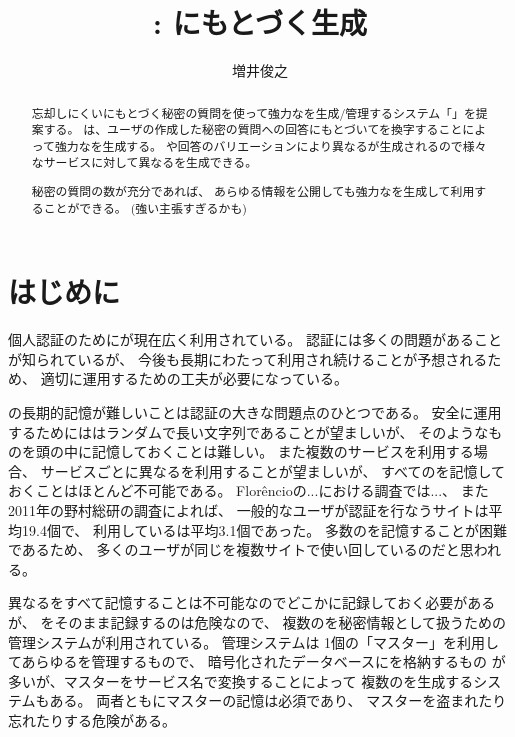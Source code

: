 \documentclass[twoside]{wiss}
\begin{document}
\title{{\EP}: {\EM}にもとづく{\PW}生成}

\author{増井俊之}

\begin{abstract}
忘却しにくい{\EM}にもとづく秘密の質問を使って強力な{\PW}を生成/管理するシステム「{\EP}」を提案する。
{\EP}は、ユーザの作成した秘密の質問への回答にもとづいて{\SS}を換字することによって強力な{\PW}を生成する。
{\SS}や回答のバリエーションにより異なる{\PW}が生成されるので様々なサービスに対して異なる{\PW}を生成できる。

秘密の質問の数が充分であれば、
あらゆる情報を公開しても強力な{\PW}を生成して利用することができる。 (強い主張すぎるかも)
\end{abstract}

\maketitle

\section{はじめに}

個人認証のために{\PW}が現在広く利用されている。
{\PW}認証には多くの問題があることが知られているが\cite{増井_ユニマガ}、
今後も長期にわたって利用され続けることが予想されるため、
適切に運用するための工夫が必要になっている。

{\PW}の長期的記憶が難しいことは{\PW}認証の大きな問題点のひとつである。
安全に運用するためには{\PW}はランダムで長い文字列であることが望ましいが、
そのようなものを頭の中に記憶しておくことは難しい。
また複数のサービスを利用する場合、
サービスごとに異なる{\PW}を利用することが望ましいが、
すべての{\PW}を記憶しておくことはほとんど不可能である。
%
Flor\^{e}ncioの...における調査では...\cite{Florencio:2007:LSW:1242572.1242661}、
また2011年の野村総研の調査によれば、
一般的なユーザが{\PW}認証を行なうサイトは平均19.4個で、
利用している{\PW}は平均3.1個であった\cite{野村総研}。
多数の{\PW}を記憶することが困難であるため、
多くのユーザが同じ{\PW}を複数サイトで使い回しているのだと思われる。

異なる{\PW}をすべて記憶することは不可能なのでどこかに記録しておく必要があるが、
{\PW}をそのまま記録するのは危険なので、
複数の{\PW}を秘密情報として扱うための{\PW}管理システムが利用されている。
{\PW}管理システムは
1個の「マスター{\PW}」を利用してあらゆる{\PW}を管理するもので、
暗号化されたデータベースに{\PW}を格納するもの%
\cite{OnePassword}%
\cite{Dashlane}%
\cite{ミルパス}%
\cite{LastPass}%
\cite{KeyPass}%
\cite{NortonIDSafe}%
\cite{IDManager}%
が多いが、マスター{\PW}をサービス名で変換することによって
複数の{\PW}を生成するシステム\cite{SuperGenPass}もある。
両者ともにマスター{\PW}の記憶は必須であり、
マスター{\PW}を盗まれたり忘れたりする危険がある。
\end{document}
